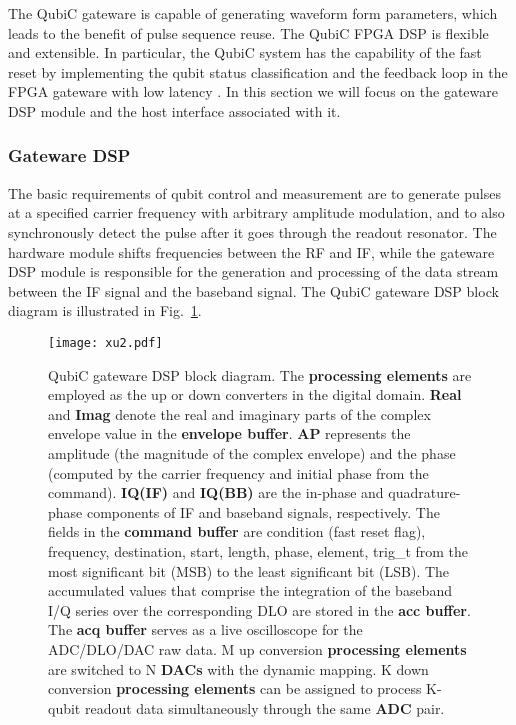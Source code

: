 \documentclass{ieeetran}
\begin{document}
The QubiC gateware is capable of generating waveform form parameters, which leads to the benefit of pulse sequence reuse.
The QubiC FPGA DSP is flexible and extensible.
In particular, the QubiC system has the capability of the fast reset by implementing the qubit status classification and the feedback loop in the FPGA gateware with low latency \cite{huang2020qubit}. 
In this section we will focus on the gateware DSP module and the host interface associated with it.

\subsubsection{Gateware DSP}
The basic requirements of qubit control and measurement are to generate pulses at a specified carrier frequency with arbitrary amplitude modulation, and to also synchronously detect the pulse after it goes through the readout resonator.
The hardware module shifts frequencies between the RF and IF, while the gateware DSP module is responsible for the generation and processing of the data stream between the IF signal and the baseband signal.
The QubiC gateware DSP block diagram is illustrated in Fig.~\ref{fig:GW}.

\begin{figure}[!ht]
\centering
\texttt{[image: xu2.pdf]}
\caption{QubiC gateware DSP block diagram. The \textbf{processing elements} are employed as the up or down converters in the digital domain. \textbf{Real} and \textbf{Imag} denote the real and imaginary parts of the complex envelope value in the \textbf{envelope buffer}. \textbf{AP} represents the amplitude (the magnitude of the complex envelope) and the phase (computed by the carrier frequency and initial phase from the command). \textbf{IQ(IF)} and \textbf{IQ(BB)} are the in-phase and quadrature-phase components of IF and baseband signals, respectively. The fields in the \textbf{command buffer} are condition (fast reset flag), frequency, destination, start, length, phase, element, trig\_t from the most significant bit (MSB) to the least significant bit (LSB). The accumulated values that comprise the integration of the baseband I/Q series over the corresponding DLO are stored in the \textbf{acc buffer}. The \textbf{acq buffer} serves as a live oscilloscope for the ADC/DLO/DAC raw data. M up conversion \textbf{processing elements} are switched to N \textbf{DACs} with the dynamic mapping. K down conversion \textbf{processing elements} can be assigned to process K-qubit readout data simultaneously through the same \textbf{ADC} pair.}
\label{fig:GW}
\end{figure}
\end{document}
